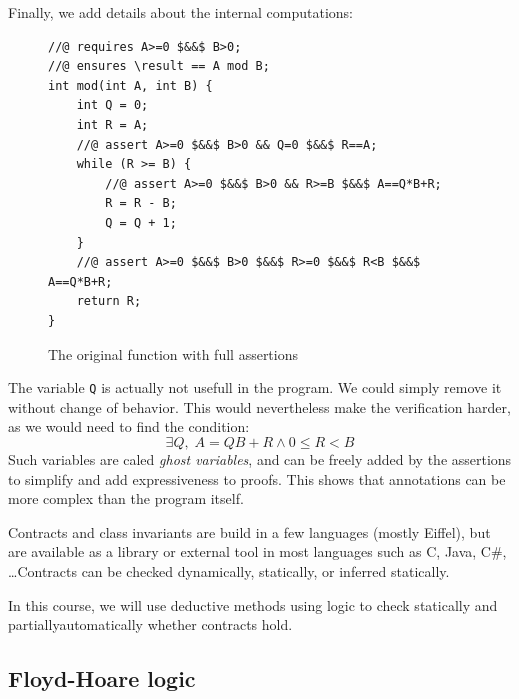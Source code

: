 \documentclass[toc, titlepaged]{../cs-classes/cs-classes}
\begin{document}
Finally, we add details about the internal computations:
\begin{figure}[H]
    \centering
    \begin{minipage}{0.7\textwidth}
        \begin{verbatim}
//@ requires A>=0 $&&$ B>0;
//@ ensures \result == A mod B;
int mod(int A, int B) {
    int Q = 0;
    int R = A;
    //@ assert A>=0 $&&$ B>0 && Q=0 $&&$ R==A;
    while (R >= B) {
        //@ assert A>=0 $&&$ B>0 && R>=B $&&$ A==Q*B+R;
        R = R - B;
        Q = Q + 1;
    }
    //@ assert A>=0 $&&$ B>0 $&&$ R>=0 $&&$ R<B $&&$ A==Q*B+R;
    return R;
}
        \end{verbatim}
    \end{minipage}
    \caption{The original function with full assertions}
\end{figure}

\begin{remark}
    The variable \texttt{Q} is actually not usefull in the program. We could simply remove it without change of behavior. This would nevertheless make the verification harder, as we would need to find the condition:
    \begin{equation*}
        \exists Q, \; A=QB+R \land 0\leq R<B
    \end{equation*}
    Such variables are caled \emph{ghost variables}, and can be freely added by the assertions to simplify and add expressiveness to proofs. This shows that annotations can be more complex than the program itself.
\end{remark}

Contracts and class invariants are build in a few languages (mostly Eiffel), but are available as a library or external tool in most languages such as C, Java, C\#, \dots Contracts can be checked dynamically, statically, or inferred statically.

In this course, we will use deductive methods using logic to check statically and partiallyautomatically whether contracts hold.

\subsection{Floyd-Hoare logic}
\end{document}
